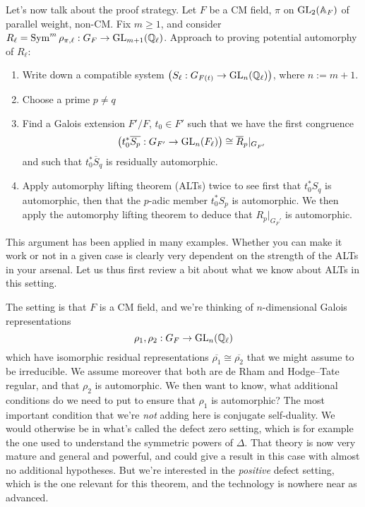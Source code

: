 \documentclass[reqno]{amsart} 
\begin{document}
Let's now talk about the proof strategy.  Let $F$ be a CM field, $\pi$ on $\operatorname{GL}_2(\mathbb{A}_F)$ of parallel weight, non-CM.  Fix $m \geq 1$, and consider $R_{\ell} = \operatorname{Sym}^m \rho_{\pi, \ell} : G_F \rightarrow \operatorname{GL}_{m + 1}(\mathbb{Q}_{\ell})$.  Approach to proving potential automorphy of $R_{\ell}$:
\begin{enumerate}
\item Write down a compatible system $\left( S_{\ell} : G_{F(t)} \rightarrow \operatorname{GL}_{n}(\mathbb{Q}_{\ell}) \right)$, where $n := m + 1$.
\item Choose a prime $p \neq q$
\item Find a Galois extension $F ' / F$, $t_0 \in F'$ such that we have the first congruence
  \begin{equation*}
    \left(     t_0^\ast \overline{S_p} : G_{F '} \rightarrow \operatorname{GL}_n(F_{\ell}) \right)
    \cong \overline{R}_p |_{ G_{F '}}
  \end{equation*}
  and such that $t_0^\ast \overline{S}_q$ is residually automorphic.
\item Apply automorphy lifting theorem (ALTs) twice to see first that
  $t_0^\ast S_q$ is automorphic, then that the $p$-adic member $t_0^\ast S_p$ is automorphic.  We then apply the automorphy lifting theorem to deduce that $R_p |_{G_F '}$ is automorphic.
\end{enumerate}
This argument has been applied in many examples.  Whether you can make it work or not in a given case is clearly very dependent on the strength of the ALTs in your arsenal.  Let us thus first review a bit about what we know about ALTs in this setting.

The setting is that $F$ is a CM field, and we're thinking of $n$-dimensional Galois representations
\begin{equation*}
  \rho_1, \rho_2 : G_F \rightarrow \operatorname{GL}_n(\mathbb{Q}_{\ell})
\end{equation*}
which have isomorphic residual representations $\overline{\rho_1} \cong \overline{\rho_2}$ that we might assume to be irreducible.  We assume moreover that both are de Rham and Hodge--Tate regular, and that $\rho_2$ is automorphic.  We then want to know, what additional conditions do we need to put to ensure that $\rho_1$ is automorphic?  The most important condition that we're \emph{not} adding here is conjugate self-duality.  We would otherwise be in what's called the defect zero setting, which is for example the one used to understand the symmetric powers of $\Delta$.  That theory is now very mature and general and powerful, and could give a result in this case with almost no additional hypotheses.  But we're interested in the \emph{positive} defect setting, which is the one relevant for this theorem, and the technology is nowhere near as advanced.
\end{document}
